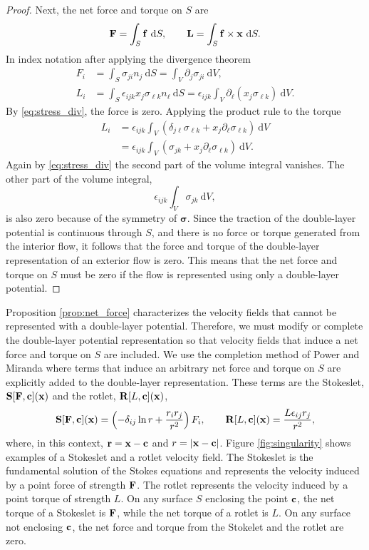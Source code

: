 \begin{proof}
	Next, the net force and torque on $S$ are 
	\[ {\mathbf{F}} = \int_S {\mathbf{f}}~\text{d}S, \qquad {\mathbf{L}} = \int_S {\mathbf{f}}\times{\mathbf{x}}~\text{d}S.\]
	In index notation after applying the divergence theorem
	\begin{align*}
	F_i &= \int_S \sigma_{ji}n_j~\text{d}S = \int_V \partial_j \sigma_{ji}~\text{d}V,\\
	 L_i &= \int_S \epsilon_{ijk}x_j\sigma_{\ell k}n_\ell~\text{d}S = \epsilon_{ijk}\int_V \partial_\ell (x_j \sigma_{\ell k})~\text{d}V.\end{align*}
	By \eqref{eq:stress_div}, the force is zero. Applying the product rule to the torque
	\begin{align*}
		 L_i &= \epsilon_{ijk}\int_V (\delta_{j\ell}\sigma_{\ell k} + x_j \partial_\ell \sigma_{\ell k})~\text{d}V\\
		 	& =  \epsilon_{ijk}\int_V (\sigma_{jk} + x_j \partial_\ell \sigma_{\ell k})~\text{d}V.
	\end{align*}
	Again by \eqref{eq:stress_div} the second part of the volume integral vanishes. The other part of the volume integral,
	\[ \epsilon_{ijk}\int_V \sigma_{jk}~\text{d}V,\]
	is also zero because of the symmetry of $\bm{\sigma}$.  Since the traction of the double-layer potential is continuous through $S$, and there is no force or torque generated from the interior flow, it follows that the force and torque of the double-layer representation of an exterior flow is zero. This means that the net force and torque on $S$ must be zero if the flow is represented using only a double-layer potential.	
\end{proof}

Proposition \ref{prop:net_force} characterizes the velocity fields that cannot be represented with a double-layer potential. Therefore, we must modify or complete the double-layer potential representation so that velocity fields that induce a net force and torque on $S$ are included.  We use the completion method of Power and Miranda \cite{Power1987, Power1993, Karrila1989} where terms that induce an arbitrary net force and torque on $S$ are explicitly added to the double-layer representation. These terms are the Stokeslet, ${\mathbf{S}}[{\mathbf{F}},{\mathbf{c}}]({\mathbf{x}})$ and the rotlet, ${\mathbf{R}}[L,{\mathbf{c}}]({\mathbf{x}})$,
\[ {\mathbf{S}}[{\mathbf{F}},{\mathbf{c}}]({\mathbf{x}}) = \left(-\delta_{ij}\ln r + \frac{r_i r_j}{r^2}\right)F_i, \qquad {\mathbf{R}}[L,{\mathbf{c}}]({\mathbf{x}}) = \frac{L \epsilon_{ij}r_j}{r^2},\]
where, in this context, ${\mathbf{r}} = {\mathbf{x}} - {\mathbf{c}}$ and $r = |{\mathbf{x}} - {\mathbf{c}}|$. Figure \ref{fig:singularity} shows examples of a Stokeslet and a rotlet velocity field. The Stokeslet is the fundamental solution of the Stokes equations and represents the velocity induced by a point force of strength ${\mathbf{F}}$. The rotlet represents the velocity induced by a point torque of strength $L$. On any surface $S$ enclosing the point ${\mathbf{c}}$, the net torque of  a Stokeslet is ${\mathbf{F}}$, while the net torque of a rotlet is $L$. On any surface not enclosing ${\mathbf{c}}$, the net force and torque from the Stokelet and the rotlet are zero. 

